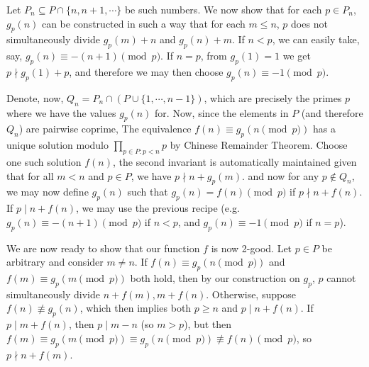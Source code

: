 \documentclass[11pt,a4paper]{article}
\begin{document}
\begin{enumerate}
Let $P_n\subseteq P\cap \{n, n + 1, \cdots\}$ be such numbers.
We now show that for each $p\in P_n$, $g_p(n)$ can be constructed in such a way that for each $m \le n$, $p$ does not simultaneously divide $g_p(m) + n$ and $g_p(n) + m$. 
If $n < p$, we can easily take, say, $g_p(n) \equiv -(n + 1)\pmod{p}$. 
If $n = p$, from $g_p(1)=1$ we get $p\nmid g_p(1)+p$, and therefore we may then choose $g_p(n)\equiv -1\pmod{p}$.  

Denote, now, $Q_n = P_n\cap (P\cup \{1, \cdots, n - 1\})$, which are precisely the primes $p$ where we have the values $g_p(n)$ for. 
Now, since the elements in $P$ (and therefore $Q_n$) are pairwise coprime, 
The equivalence $f(n)\equiv g_p(n\pmod{p})$ has a unique solution modulo $\prod_{p\in P: p < n} p$ by Chinese Remainder Theorem. 
Choose one such solution $f(n)$, the second invariant is automatically maintained given that for all $m < n$ and $p\in P$,
we have $p\nmid n + g_p(m)$. 
 and now for any $p\not \in Q_n$, we may now define $g_p(n)$ such that $g_p(n) = f(n)\pmod{p}$ if $p\nmid n + f(n)$. 
If $p\mid n + f(n)$, we may use the previous recipe (e.g. $g_p(n)\equiv -(n + 1)\pmod{p}$ if $n < p$, and $g_p(n)\equiv -1\pmod{p}$ if $n=p$). 

We are now ready to show that our function $f$ is now 2-good. Let $p\in P$ be arbitrary and consider $m\neq n$. 
If $f(n)\equiv g_p(n\pmod{p})$ and $f(m)\equiv g_p(m\pmod{p})$ both hold, then by our construction on $g_p$, 
$p$ cannot simultaneously divide $n+f(m), m + f(n)$. 
Otherwise, suppose $f(n)\not\equiv g_p(n)$, which then implies both 
$p \ge n$ and $p\mid n + f(n)$. 
If $p\mid m + f(n)$, then $p\mid m - n$ (so $m > p$), but then $f(m)\equiv g_p(m\pmod{p})\equiv g_p(n\pmod{p})\not\equiv f(n)\pmod{p}$, 
so $p\nmid n + f(m)$. 

\end{enumerate}
\end{document}
